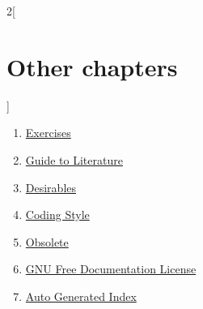 \begin{multicols}{2}[\section{Other chapters}]
\begin{enumerate}
\item \hyperref[exercises-section-phantom]{Exercises}
\item \hyperref[guide-section-phantom]{Guide to Literature}
\item \hyperref[desirables-section-phantom]{Desirables}
\item \hyperref[coding-section-phantom]{Coding Style}
\item \hyperref[obsolete-section-phantom]{Obsolete}
\item \hyperref[fdl-section-phantom]{GNU Free Documentation License}
\item \hyperref[index-section-phantom]{Auto Generated Index}
\end{enumerate}
\end{multicols}
